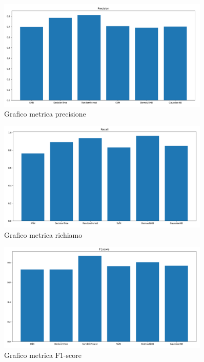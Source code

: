 \documentclass{article}
\begin{document}
\begin{figure}[H]
        \includegraphics[width=0.9\textwidth]{Precision}
        \centering
        \caption{Grafico metrica precisione}
        \centering
\end{figure}

\begin{figure}[H]
        \includegraphics[width=0.9\textwidth]{Recall}
        \centering
        \caption{Grafico metrica richiamo}
        \centering
\end{figure}

\begin{figure}[H]
        \includegraphics[width=0.9\textwidth]{F1score}
        \centering
        \caption{Grafico metrica F1-score}
        \centering
\end{figure}
%
\end{document}
